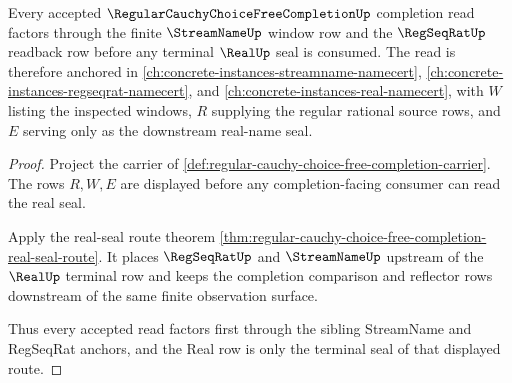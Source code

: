\begin{theorem}
\label{thm:regular-cauchy-choice-free-completion-streamname-anchor}
Every accepted $\RegularCauchyChoiceFreeCompletionUp$ completion read factors through the finite $\StreamNameUp$ window row and the $\RegSeqRatUp$ readback row before any terminal $\RealUp$ seal is consumed. The read is therefore anchored in \autoref{ch:concrete-instances-streamname-namecert}, \autoref{ch:concrete-instances-regseqrat-namecert}, and \autoref{ch:concrete-instances-real-namecert}, with $W$ listing the inspected windows, $R$ supplying the regular rational source rows, and $E$ serving only as the downstream real-name seal.
\end{theorem}
\begin{proof}
Project the carrier of \autoref{def:regular-cauchy-choice-free-completion-carrier}. The rows $R,W,E$ are displayed before any completion-facing consumer can read the real seal.

Apply the real-seal route theorem \autoref{thm:regular-cauchy-choice-free-completion-real-seal-route}. It places $\RegSeqRatUp$ and $\StreamNameUp$ upstream of the $\RealUp$ terminal row and keeps the completion comparison and reflector rows downstream of the same finite observation surface.

Thus every accepted read factors first through the sibling StreamName and RegSeqRat anchors, and the Real row is only the terminal seal of that displayed route.
\end{proof}

